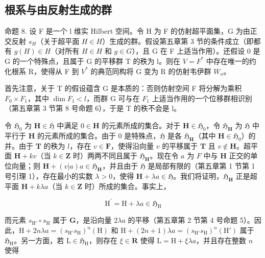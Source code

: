 \subsection{根系与由反射生成的群}

命题 8. 设 F 是一个 l 维实 Hilbert 空间。令 H 为 F 的仿射超平面集，G 为由正交反射 \(s_{H}\)（关于超平面 \(H \in H\)）生成的群。假设第五章第 3 节的条件成立（即都有 \(g(H) \in H\)（对所有 \(H \in H\) 和 \(g \in G\)），且 G 在 F 上适当作用）。还假设 0 是 G 的一个特殊点，且属于 G 的平移群 T 的秩为 l。则在 \(V = F^{*}\) 中存在唯一的约化根系 R，使得从 F 到 \(V^{*}\) 的典范同构将 G 变为 R 的仿射韦伊群 \(W_{a}\)。

首先注意，关于 T 的假设蕴含 G 是本质的：否则仿射空间 F 将分解为乘积 \(F_{0} \times F_{1}\)，其中 \(\dim F_{1} < l\)，而群 G 可与在 \(F_{1}\) 上适当作用的一个位移群相识别（第五章第 3 节第 8 号命题 6），于是 T 的秩不会是 l。

令 \(\mathfrak{H}_0\) 为 \(\mathbf{H} \in \mathfrak{H}\) 中满足 \(0 \in \mathbf{H}\) 的元素所成的集合。对于 \(\mathbf{H} \in \mathfrak{H}_0\)，令 \(\mathfrak{H}_{\mathbf{H}}\) 为 \(\mathfrak{H}\) 中平行于 \(\mathbf{H}\) 的元素所成的集合。由于 0 是特殊点，\(\mathfrak{H}\) 是各 \(\mathfrak{H}_{\mathbf{H}}\)（其中 \(\mathbf{H} \in \mathfrak{H}_0\)）的并。由于 \(\mathbf{T}\) 的秩为 \(l\)，存在 \(v \in \mathbf{F}\)，使得沿向量 \(v\) 的平移属于 \(\mathbf{T}\) 且 \(v \notin \mathbf{H}\)。超平面 \(\mathbf{H} + kv\)（当 \(k \in \mathbf{Z}\) 时）两两不同且属于 \(\mathfrak{H}_{\mathbf{H}}\)。现在令 \(a\) 为 \(F\) 中与 \(\mathbf{H}\) 正交的单位向量；则 \(\mathbf{H} + (v|a)a \in \mathfrak{H}_{\mathbf{H}}\)，并且由于 \(\mathfrak{H}\) 是局部有限的（第五章第 1 节第 1 号引理 1），存在最小的实数 \(\lambda > 0\)，使得 \(\mathbf{H} + \lambda a \in \mathfrak{H}\)。我们将证明，\(\mathfrak{H}_{\mathbf{H}}\) 正是超平面 \(\mathbf{H} + k\lambda a\)（当 \(k \in \mathbf{Z}\) 时）所成的集合。事实上，

\[
\mathrm{H} ^ {\prime} = \mathrm{H} + \lambda a \in \mathfrak {H} _ {\mathrm{H}}
\]

而元素 \(s_{\mathrm{H}'} \circ s_{\mathrm{H}}\) 属于 \(\mathbf{G}\)，是沿向量 \(2\lambda a\) 的平移（第五章第 2 节第 4 号命题 5）。因此，\(\mathrm{H} + 2n\lambda a = (s_{\mathrm{H}'}s_{\mathrm{H}})^n(\mathrm{H})\) 和 \(\mathrm{H} + (2n + 1)\lambda a = (s_{\mathrm{H}'}s_{\mathrm{H}})^n(\mathrm{H}')\) 属于 \(\mathfrak{H}_{\mathrm{H}}\)。另一方面，若 \(\mathrm{L} \in \mathfrak{H}_{\mathrm{H}}\)，则存在 \(\xi \in \mathbf{R}\) 使得 \(\mathrm{L} = \mathrm{H} + \xi \lambda a\)，并且存在整数 \(n\) 使得

